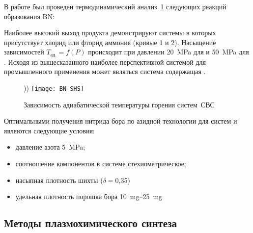В работе \cite{amosov2007azidnaa} был проведен термодинамический анализ~\ref{fig:BN-SHS} следующих
реакций образования BN:


Наиболее высокий выход продукта демонстрируют системы в которых присутствует 
хлорид или фторид аммония (кривые 1 и 2). Насыщение зависимостей $T_\text{ад.} = f(P)$
происходит при давлении \SI{20}{\mega\pascal}  для  и \SI{50}{\mega\pascal}
для . Исходя из вышесказанного наиболее перспективной системой для промышленного
применения может являться система содержащая .

\begin{figure}[ht]
    \centerfloat)){
    \texttt{[image: BN-SHS]}}
    \caption{Зависимость адиабатической температуры горения систем~СВС}
    \label{fig:BN-SHS}
\end{figure}

Оптимальными получения нитрида бора по азидной технологии для систем 
 и  являются следующие условия:
 
\begin{itemize}
    \item давление азота \SI{5}{\mega\pascal};
    \item соотношение компонентов в системе стехиометрическое; 
    \item насыпная плотность шихты ($\delta=$0,35)
    \item удельная плотность порошка бора \SIrange{10}{25}{\milli\gram} 
 \end{itemize}

\subsection{Методы плазмохимического синтеза}%
\label{sub:Методы плазмохимического синтеза}

